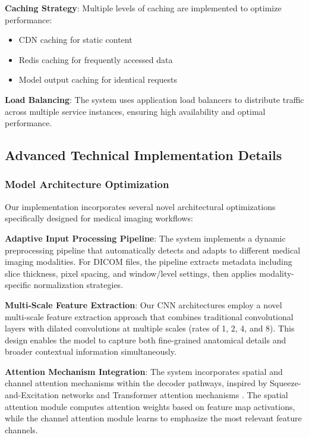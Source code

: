 \documentclass[12pt,a4paper]{article}
\begin{document}
\textbf{Caching Strategy}: Multiple levels of caching are implemented to optimize performance:
\begin{itemize}
    \item CDN caching for static content
    \item Redis caching for frequently accessed data
    \item Model output caching for identical requests
\end{itemize}

\textbf{Load Balancing}: The system uses application load balancers to distribute traffic across multiple service instances, ensuring high availability and optimal performance.

\subsection{Advanced Technical Implementation Details}

\subsubsection{Model Architecture Optimization}

Our implementation incorporates several novel architectural optimizations specifically designed for medical imaging workflows:

\textbf{Adaptive Input Processing Pipeline}: The system implements a dynamic preprocessing pipeline that automatically detects and adapts to different medical imaging modalities. For DICOM files, the pipeline extracts metadata including slice thickness, pixel spacing, and window/level settings, then applies modality-specific normalization strategies.

\textbf{Multi-Scale Feature Extraction}: Our CNN architectures employ a novel multi-scale feature extraction approach that combines traditional convolutional layers with dilated convolutions at multiple scales (rates of 1, 2, 4, and 8). This design enables the model to capture both fine-grained anatomical details and broader contextual information simultaneously.

\textbf{Attention Mechanism Integration}: The system incorporates spatial and channel attention mechanisms within the decoder pathways, inspired by Squeeze-and-Excitation networks \cite{hu2018squeeze} and Transformer attention mechanisms \cite{vaswani2017attention}. The spatial attention module computes attention weights based on feature map activations, while the channel attention module learns to emphasize the most relevant feature channels.
\end{document}
